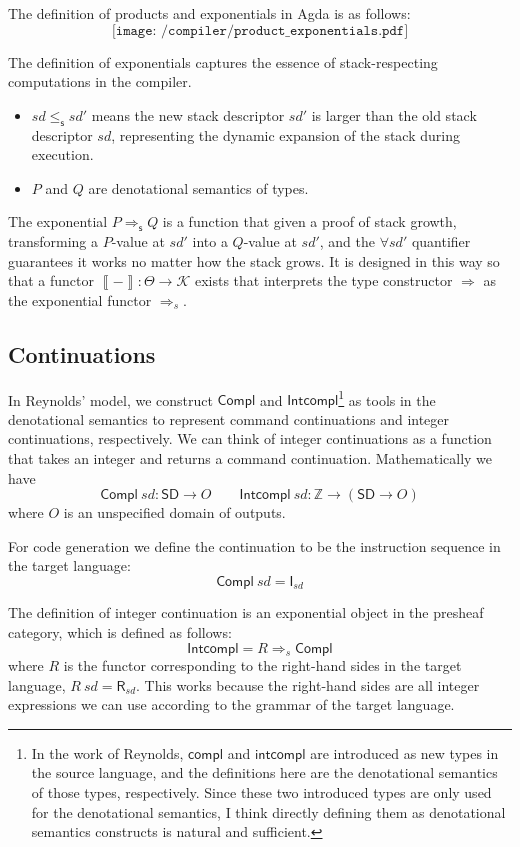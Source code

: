 \documentclass[12pt,a4paper]{report}
\theoremstyle{definition}
\newcommand{\bZ}{\mathbb{Z}}
\newcommand{\intp}[1]{\left\llbracket #1 \right\rrbracket}
\begin{document}
    The definition of products and exponentials in Agda is as follows:
    \[\texttt{[image: /compiler/product\_exponentials.pdf]}\]

    The definition of exponentials captures the essence of stack-respecting computations in the compiler. 
    \begin{itemize}
        \item $sd \leq_\mathsf{s} sd'$ means the new stack descriptor $sd'$ is larger than the old stack descriptor $sd$, representing the dynamic expansion of the stack during execution.

        \item $P$ and $Q$ are denotational semantics of types. 
    \end{itemize}
    The exponential $P \Rightarrow_\textsf{s} Q$ is a function that given a proof of stack growth, transforming a $P$-value at $sd'$ into a $Q$-value at $sd'$, and the $\forall{sd'}$ quantifier guarantees it works no matter how the stack grows. It is designed in this way so that a functor $\intp{-} : \Theta \to \mathcal{K}$ exists that interprets the type constructor $\Rightarrow$ as the exponential functor $\Rightarrow_s$.

    \subsection{Continuations}
    In Reynolds' model, we construct $\mathsf{Compl}$ and $\mathsf{Intcompl}$\footnote{In the work of Reynolds, $\mathsf{compl}$ and $\mathsf{intcompl}$ are introduced as new types in the source language, and the definitions here are the denotational semantics of those types, respectively. Since these two introduced types are only used for the denotational semantics, I think directly defining them as denotational semantics constructs is natural and sufficient.} as tools in the denotational semantics to represent command continuations and integer continuations, respectively. We can think of integer continuations as a function that takes an integer and returns a command continuation. Mathematically we have
    \[\mathsf{Compl}\ sd : \mathsf{SD} \to O \qquad \mathsf{Intcompl}\ sd : \bZ \to (\mathsf{SD} \to O)\]
    where $O$ is an unspecified domain of outputs.

    For code generation we define the continuation to be the instruction sequence in the target language:
    \[\mathsf{Compl}\ sd = \textsf{I}_{sd}\]

    The definition of integer continuation is an exponential object in the presheaf category, which is defined as follows:
    \[\mathsf{Intcompl} = R \Rightarrow_s \mathsf{Compl} \]
    where $R$ is the functor corresponding to the right-hand sides in the target language, $R\ sd = \textsf{R}_{sd}$. This works because the right-hand sides are all integer expressions we can use according to the grammar of the target language.
    
\end{document}
